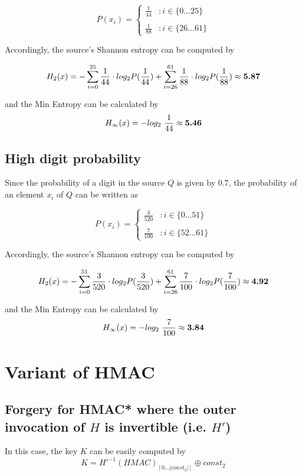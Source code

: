 $$
P(x_i) = \left\{
  \begin{array}{ll}
    \frac{1}{44} & : i \in \{0...25\}\\\\
    \frac{1}{88} & : i \in \{26...61\}
  \end{array}
\right.
$$

Accordingly, the source's Shannon entropy can be computed by

$$
H_2(x) = -\displaystyle\sum_{i=0}^{25}\frac{1}{44}\cdot log_2 P(\frac{1}{44}) + \displaystyle\sum_{i=26}^{61}\frac{1}{88}\cdot log_2 P(\frac{1}{88})
\approx \text{\textbf{5.87}}
$$

and the Min Entropy can be calculated by
$$
H_{\infty}(x)= -log_2\ \frac{1}{44}
\approx \text{\textbf{5.46}}
$$

\subsection{High digit probability}

Since the probability of a digit in the source $Q$ is given by $0.7$, the probability of an element $x_i$ of $Q$ can be written as

$$
P(x_i) = \left\{
  \begin{array}{ll}
    \frac{3}{520} & : i \in \{0...51\}\\\\
    \frac{7}{100} & : i \in \{52...61\}
  \end{array}
\right.
$$

Accordingly, the source's Shannon entropy can be computed by

$$
H_2(x) = -\displaystyle\sum_{i=0}^{51}\frac{3}{520}\cdot log_2 P(\frac{3}{520}) + \displaystyle\sum_{i=26}^{61}\frac{7}{100}\cdot log_2 P(\frac{7}{100})
\approx \text{\textbf{4.92}}
$$

and the Min Entropy can be calculated by
$$
H_{\infty}(x)= -log_2\ \frac{7}{100}
\approx \text{\textbf{3.84}}
$$

\section{Variant of HMAC}
\subsection{Forgery for HMAC* where the outer invocation of $H$ is invertible (i.e. $H'$)}

In this case, the key $K$ can be easily computed by
$$
K= H'^{-1}(HMAC)_{[0...|const_2|]} \oplus const_2
$$

